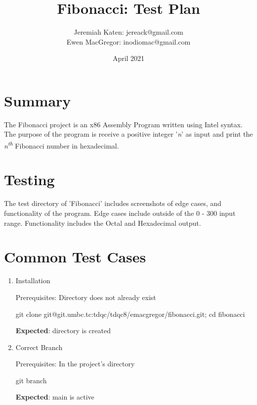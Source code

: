 \documentclass{article}
\title{Fibonacci: Test Plan}
\author{Jeremiah Katen: jereack@gmail.com \\ Ewen MacGregor: inodiomac@gmail.com}
\date{April 2021}
\begin{document}
\maketitle

\section{Summary}
The Fibonacci project is an x86 Assembly Program written using Intel syntax. The purpose of the program is receive a positive integer '\textit{n}' as input and print the \textit{n\textsuperscript{th}} Fibonacci number in hexadecimal.

\section{Testing}
The test directory of 'Fibonacci' includes screenshots of edge cases, and functionality of the program.
Edge cases include outside of the 0 - 300 input range.
Functionality includes the Octal and Hexadecimal output.

\section{Common Test Cases}

\begin{enumerate}
    \item Installation
    
    Prerequisites: Directory does not already exist

    {\footnotesize git clone git@git.umbc.tc:tdqc/tdqc8/emacgregor/fibonacci.git; cd fibonacci}
    
    \textbf{Expected}: directory is created

    \item Correct Branch
    
    Prerequisites: In the project's directory
    
    {\footnotesize git branch}
    
    \textbf{Expected}: {\footnotesize main} is active
\end{enumerate}
\end{document}
